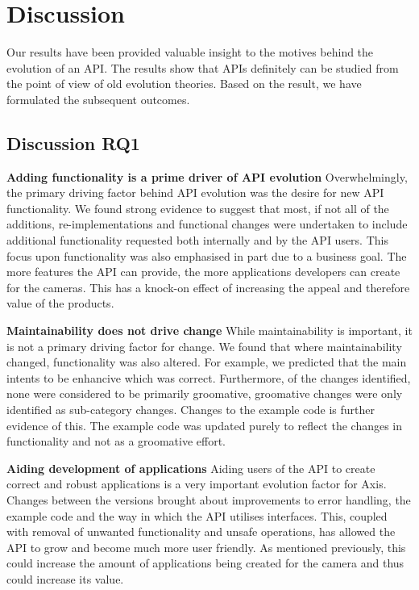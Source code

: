\documentclass{sig-alternate}
\begin{document}
\section{Discussion}
Our results have been provided valuable insight to the motives behind the evolution of an API. The results show that APIs definitely can be studied from the point of view of old evolution theories. Based on the result, we have formulated the subsequent outcomes. 



\subsection{Discussion RQ1}

\noindent
\textbf{Adding functionality is a prime driver of API evolution  }
Overwhelmingly, the primary driving factor behind API evolution was the desire for new API functionality. We found strong evidence to suggest that most, if not all of the additions, re-implementations and functional changes were undertaken to include additional functionality requested both internally and by the API users. This focus upon functionality was also emphasised in part due to a business goal. The more features the API can provide, the more applications developers can create for the cameras. This has a knock-on effect of increasing the appeal and therefore value of the products.

\smallskip \noindent
\textbf{Maintainability does not drive change  } 
While maintainability is important, it is not a primary driving factor for change. We found that where maintainability changed, functionality was also altered. For example, we predicted that the main intents to be enhancive which was correct. Furthermore, of the changes identified, none were considered to be primarily groomative, groomative changes were only identified as sub-category changes. Changes to the example code is further evidence of this. The example code was updated purely to reflect the changes in functionality and not as a groomative effort. 

\smallskip \noindent
\textbf{Aiding development of applications  } 
Aiding users of the API to create correct and robust applications is a very important evolution factor for Axis. Changes between the versions brought about improvements to error handling, the example code and the way in which the API utilises interfaces. This, coupled with removal of unwanted functionality and unsafe operations, has allowed the API to grow and become much more user friendly. As mentioned previously, this could increase the amount of applications being created for the camera and thus could increase its value.
\end{document}
